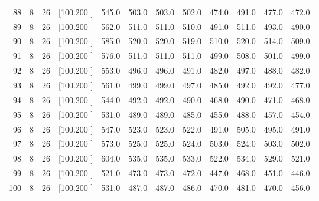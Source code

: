\documentclass[12pt,a4paper]{article}
\begin{document}
\begin{center}
{\begin{tabular}{r r r r r r r r r r r r}
  88&  8& 26&[100.200   ]&   545.0&   503.0&   503.0&   502.0&   474.0&   491.0&   477.0&   472.0\\[-0.02in]
  89&  8& 26&[100.200   ]&   562.0&   511.0&   511.0&   510.0&   491.0&   511.0&   493.0&   490.0\\[-0.02in]
  90&  8& 26&[100.200   ]&   585.0&   520.0&   520.0&   519.0&   510.0&   520.0&   514.0&   509.0\\[-0.02in]
  91&  8& 26&[100.200   ]&   576.0&   511.0&   511.0&   511.0&   499.0&   508.0&   501.0&   499.0\\[-0.02in]
  92&  8& 26&[100.200   ]&   553.0&   496.0&   496.0&   491.0&   482.0&   497.0&   488.0&   482.0\\[-0.02in]
  93&  8& 26&[100.200   ]&   561.0&   499.0&   499.0&   497.0&   485.0&   492.0&   492.0&   477.0\\[-0.02in]
  94&  8& 26&[100.200   ]&   544.0&   492.0&   492.0&   490.0&   468.0&   490.0&   471.0&   468.0\\[-0.02in]
  95&  8& 26&[100.200   ]&   531.0&   489.0&   489.0&   485.0&   455.0&   488.0&   457.0&   454.0\\[-0.02in]
  96&  8& 26&[100.200   ]&   547.0&   523.0&   523.0&   522.0&   491.0&   505.0&   495.0&   491.0\\[-0.02in]
  97&  8& 26&[100.200   ]&   573.0&   525.0&   525.0&   524.0&   503.0&   524.0&   503.0&   502.0\\[-0.02in]
  98&  8& 26&[100.200   ]&   604.0&   535.0&   535.0&   533.0&   522.0&   534.0&   529.0&   521.0\\[-0.02in]
  99&  8& 26&[100.200   ]&   521.0&   473.0&   473.0&   472.0&   447.0&   468.0&   451.0&   446.0\\[-0.02in]
 100&  8& 26&[100.200   ]&   531.0&   487.0&   487.0&   486.0&   470.0&   481.0&   470.0&   456.0\\[-0.02in]

\hline
\end{tabular}}
\end{center}
\end{document}
